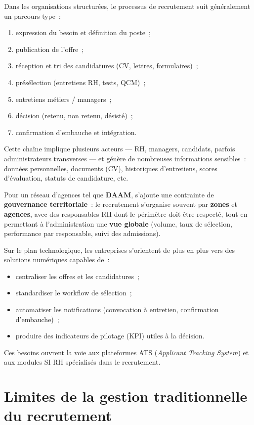 Dans les organisations structurées, le processus de recrutement suit généralement
un parcours type~:
\begin{enumerate}
  \item expression du besoin et définition du poste~;
  \item publication de l'offre~;
  \item réception et tri des candidatures (CV, lettres, formulaires)~;
  \item présélection (entretiens RH, tests, QCM)~;
  \item entretiens métiers / managers~;
  \item décision (retenu, non retenu, désisté)~;
  \item confirmation d'embauche et intégration.
\end{enumerate}

Cette chaîne implique plusieurs acteurs --- RH, managers, candidats, parfois
administrateurs transverses --- et génère de nombreuses informations sensibles~:
données personnelles, documents (CV), historiques d'entretiens, scores d'évaluation,
statuts de candidature, etc.

Pour un réseau d'agences tel que \textbf{DAAM}, s'ajoute une contrainte de
\textbf{gouvernance territoriale}~: le recrutement s'organise souvent par \textbf{zones}
et \textbf{agences}, avec des responsables RH dont le périmètre doit être respecté,
tout en permettant à l'administration une \textbf{vue globale} (volume, taux de
sélection, performance par responsable, suivi des admissions).

Sur le plan technologique, les entreprises s'orientent de plus en plus vers des
solutions numériques capables de~:
\begin{itemize}
  \item centraliser les offres et les candidatures~;
  \item standardiser le workflow de sélection~;
  \item automatiser les notifications (convocation à entretien, confirmation d'embauche)~;
  \item produire des indicateurs de pilotage (KPI) utiles à la décision.
\end{itemize}

Ces besoins ouvrent la voie aux plateformes ATS (\textit{Applicant Tracking System})
et aux modules SI RH spécialisés dans le recrutement.


\section{Limites de la gestion traditionnelle du recrutement}

